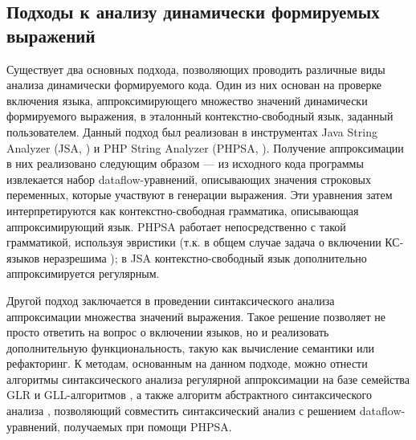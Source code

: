 
\subsection{Подходы к анализу динамически формируемых выражений}

Существует два основных подхода, позволяющих проводить различные виды анализа динамически формируемого кода. Один из них основан на проверке включения языка, аппроксимирующего множество значений динамически формируемого выражения, в эталонный контекстно-свободный язык, заданный пользователем. 
Данный подход был реализован в инструментах Java String Analyzer (JSA, \cite{jsa}) и PHP String Analyzer (PHPSA, \cite{phpsa}). %
Получение аппроксимации в них реализовано следующим образом --- из исходного кода программы извлекается набор dataflow-уравнений, описывающих значения строковых переменных, которые участвуют в генерации выражения. Эти уравнения затем интерпретируются как контекстно-свободная грамматика, описывающая аппроксимирующий язык. PHPSA работает непосредственно с такой грамматикой, используя эвристики (т.к. в общем случае задача о включении КС-языков неразрешима \cite{lang_inclusion}); в JSA контекстно-свободный язык дополнительно аппроксимируется регулярным.


Другой подход заключается в проведении синтаксического анализа аппроксимации множества значений выражения. 
Такое решение позволяет не просто ответить на вопрос о включении языков, но и реализовать дополнительную функциональность, такую как вычисление семантики или рефакторинг. 
К методам, основанным на данном подходе, можно отнести алгоритмы синтаксического анализа регулярной аппроксимации на базе семейства GLR \cite{alvor, rnglr_reg} и GLL-алгоритмов \cite{gll_reg}, а также алгоритм абстрактного синтаксического анализа \cite{a_lr}, позволяющий совместить синтаксический анализ с решением dataflow-уравнений, получаемых при помощи PHPSA.

